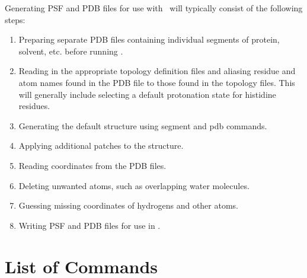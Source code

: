 Generating PSF and PDB files for use with \NAMD\ will typically consist of
the following steps:

\begin{enumerate}
\item Preparing separate PDB files containing individual segments of
protein, solvent, etc. before running \PSFGEN.
\item Reading in the appropriate topology definition files and aliasing
residue and atom names found in the PDB file to those found in the topology
files.  This will generally include selecting a default protonation state
for histidine residues.
\item Generating the default structure using segment and pdb commands.
\item Applying additional patches to the structure.
\item Reading coordinates from the PDB files.
\item Deleting unwanted atoms, such as overlapping water molecules.
\item Guessing missing coordinates of hydrogens and other atoms.
\item Writing PSF and PDB files for use in \NAMD.
\end{enumerate}

\section{List of Commands}

